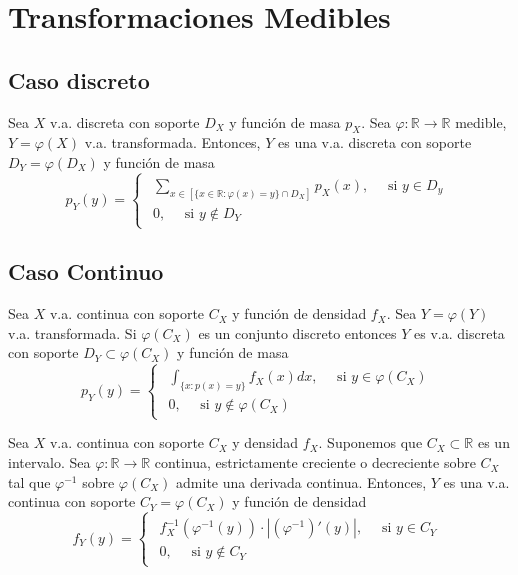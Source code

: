 \section{Transformaciones Medibles}

\subsection{Caso discreto}

\begin{theo}
  Sea $X$ v.a. discreta con soporte $D_{X}$ y función de masa $p_{X}$. Sea $\varphi :  \mathbb{R} \to \mathbb{R}$ medible, $Y = \varphi(X)$ v.a. transformada. Entonces, $Y$ es una v.a. discreta con soporte $D_{Y} = \varphi(D_{X})$ y función de masa
  \[ 
    p_{Y}(y)  =
    \begin{cases}
      \begin{aligned}
        \sum_{x \in [\{ x \in \mathbb{R} : \varphi(x) = y \} \cap D_{X}]} p_{X}(x), \quad \text{ si } y \in D_{y} \\
      0, \quad \text{ si } y \not \in D_{Y}
      \end{aligned}
    \end{cases} 
  \] 
\end{theo}

\subsection{Caso Continuo}

\begin{theo}
  Sea $X$ v.a. continua con soporte $C_{X}$ y función de densidad $f_{X}$. Sea $Y = \varphi(Y)$ v.a. transformada. Si $\varphi(C_{X})$ es un conjunto discreto entonces $Y$ es v.a. discreta con soporte $D_{Y} \subset \varphi(C_{X})$ y función de masa
  \[ 
    p_{Y}(y)  =
    \begin{cases}
      \begin{aligned}
        \int_{\{ x : p(x) = y \}}^{} f_{X}(x) dx, \quad \text{ si } y \in \varphi(C_{X}) \\
        0, \quad \text{ si } y \not \in \varphi(C_{X})
      \end{aligned}
    \end{cases} 
  \] 
\end{theo}

\begin{theo}
  Sea $X$ v.a. continua con soporte $C_{X}$ y densidad $f_{X}$. Suponemos que $ C_{X} \subset \mathbb{R}$ es un intervalo. Sea $\varphi :  \mathbb{R} \to \mathbb{R}$ continua, estrictamente creciente o decreciente sobre $C_{X}$ tal que $\varphi^{-1}$ sobre $\varphi(C_{X})$ admite una derivada continua. Entonces, $Y$ es una v.a. continua con soporte $C_{Y} = \varphi(C_{X})$ y función de densidad
  \[ 
    f_{Y}(y) = 
    \begin{cases}
      \begin{aligned}
        f_{X}^{-1}(\varphi^{-1}(y)) \cdot | (\varphi^{-1})'(y) |, \quad \text{ si } y \in C_{Y} \\
        0, \quad \text{ si } y \not \in C_{Y}
      \end{aligned}
    \end{cases} 
  \] 
\end{theo}

